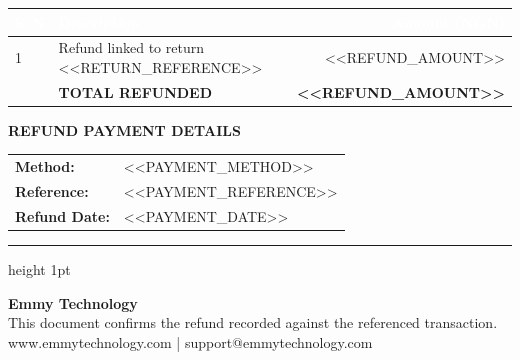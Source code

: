 \documentclass[11pt, a4paper]{article}
\begin{document}
\renewcommand{\arraystretch}{1.3}
\begin{tabularx}{\textwidth}{l X r}
    \rowcolor{brandblue}
    \textbf{\textcolor{white}{S/N}} & \textbf{\textcolor{white}{Description}} & \textbf{\textcolor{white}{Amount (NGN)}} \\
    \midrule
    1 & Refund linked to return <<RETURN_REFERENCE>> & <<REFUND_AMOUNT>> \\
    \midrule
    \rowcolor{lightgray}
    & \textbf{TOTAL REFUNDED} & \textbf{<<REFUND_AMOUNT>>} \\
    \bottomrule
\end{tabularx}
\vspace{6mm}
\noindent
\textbf{\textcolor{brandblue}{REFUND PAYMENT DETAILS}} \\
\vspace{2mm}
\begin{tabular}{l l}
  \textbf{Method:} & <<PAYMENT_METHOD>> \\
  \textbf{Reference:} & <<PAYMENT_REFERENCE>> \\
  \textbf{Refund Date:} & <<PAYMENT_DATE>> \\
\end{tabular}
\vfill
\begin{center}
    {\color{brandyellow}\hrule height 1pt}
    \vspace{2mm}
    \small
    \textbf{Emmy Technology} \\
    This document confirms the refund recorded against the referenced transaction. \\
    \vspace{1mm}
    \textcolor{brandblue}{www.emmytechnology.com} | \textcolor{brandblue}{support@emmytechnology.com}
\end{center}
\end{document}
